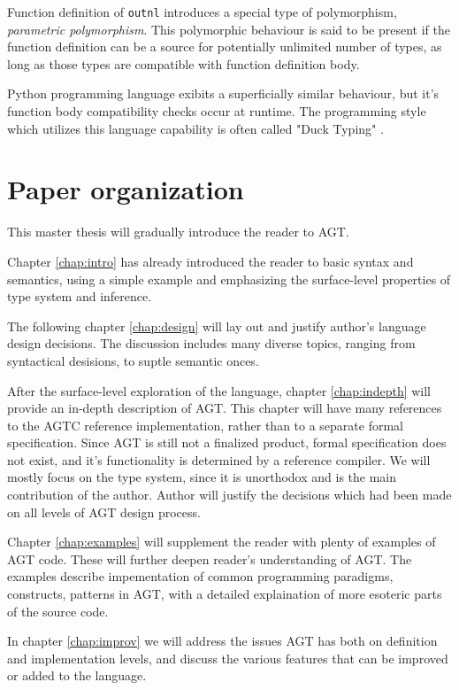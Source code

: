 \documentclass[times, utf8, diplomski]{fer}
\theoremstyle{definition}
\begin{document}
Function definition of \texttt{outnl} introduces a special type of polymorphism, 
\textit{parametric polymorphism}. This polymorphic behaviour is said to be present if the
function definition can be a source for potentially unlimited number of types, 
as long as those types are compatible with function definition body.

Python programming language exibits a superficially similar behaviour, but it's
function body compatibility checks occur at runtime. 
The programming style which utilizes this language capability is often called "Duck Typing" 
\citep{c_py_duck_typing}.


\section{Paper organization}

This master thesis will gradually introduce the reader to AGT. 

Chapter \ref{chap:intro} has already introduced the reader to basic syntax and semantics,
using a simple example and emphasizing the surface-level properties of type system and inference. 

The following chapter \ref{chap:design} will lay out and justify author's
language design decisions. The discussion includes many diverse topics,
ranging from syntactical desisions, to suptle semantic onces.

After the surface-level exploration of the language, chapter \ref{chap:indepth}
will provide an in-depth description of AGT.
This chapter will have many references to the AGTC reference implementation, 
rather than to a separate formal specification. Since AGT is still not a finalized product,
formal specification does not exist, and it's functionality is determined by a reference compiler.
We will mostly focus on the type system, since it is unorthodox and is the main
contribution of the author.  Author will justify the decisions which had been
made on all levels of AGT design process.

Chapter \ref{chap:examples} will supplement the reader with plenty of examples of AGT code. These will
further deepen reader's understanding of AGT. The examples describe impementation
of common programming paradigms, constructs, patterns in AGT, with a detailed
explaination of more esoteric parts of the source code.

In chapter \ref{chap:improv} we will address the issues AGT has both on
definition and implementation levels, and discuss the various features that can
be improved or added to the language.
\end{document}
